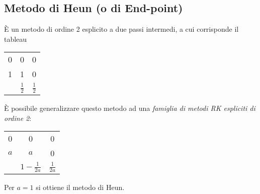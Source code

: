 \subsection{Metodo di Heun (o di End-point)}
È un metodo di ordine 2 esplicito a due passi intermedi, a cui corrisponde il tableau
\begin{center}
\begin{tabular}{c|cc}
0 & 0 & 0 \\
1 & 1 & 0 \\
\midrule
 & $\frac{1}{2}$ & $\frac{1}{2}$ \\
\end{tabular}
\end{center}
È possibile generalizzare questo metodo ad una \emph{famiglia di metodi RK espliciti di ordine 2}:
\begin{center}
\begin{tabular}{c|cc}
0 & 0 & 0 \\
$a$ & $a$ & 0 \\
\midrule
 & $1 - \frac{1}{2a}$ & $\frac{1}{2a}$ \\
\end{tabular}
\end{center}
Per $a = 1$ si ottiene il metodo di Heun.

